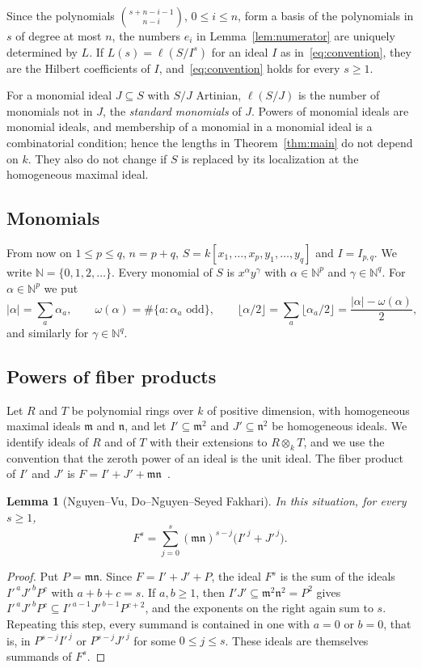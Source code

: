 \documentclass{amsart}
\newtheorem{lemma}[theorem]{Lemma}
\theoremstyle{definition}
\theoremstyle{remark}
\numberwithin{equation}{section}
\newcommand{\NN}{\mathbb{N}}
\newcommand{\mm}{\mathfrak{m}}
\newcommand{\fl}[1]{\lfloor #1\rfloor}
\begin{document}
Since the polynomials $\binom{s+n-i-1}{n-i}$, $0\le i\le n$, form a basis of the
polynomials in $s$ of degree at most $n$, the numbers $e_i$ in
Lemma~\ref{lem:numerator} are uniquely determined by $L$. If
$L(s)=\ell(S/I^s)$ for an ideal $I$ as in~\eqref{eq:convention}, they are the
Hilbert coefficients of $I$, and~\eqref{eq:convention} holds for every $s\ge1$.

For a monomial ideal $J\subseteq S$ with $S/J$ Artinian, $\ell(S/J)$ is the
number of monomials not in $J$, the \emph{standard monomials} of $J$. Powers of
monomial ideals are monomial ideals, and membership of a monomial in a monomial
ideal is a combinatorial condition; hence the lengths in Theorem~\ref{thm:main}
do not depend on $k$. They also do not change if $S$ is replaced by its localization
at the homogeneous maximal ideal.

\subsection{Monomials}
From now on $1\le p\le q$, $n=p+q$, $S=k[x_1,\dots,x_p,y_1,\dots,y_q]$ and
$I=I_{p,q}$. We write $\NN=\{0,1,2,\dots\}$. Every monomial of $S$ is $x^\alpha y^\gamma$ with $\alpha\in\NN^p$
and $\gamma\in\NN^q$. For $\alpha\in\NN^p$ we put
\[
  |\alpha|=\sum_a\alpha_a,\qquad
  \omega(\alpha)=\#\{a:\alpha_a\text{ odd}\},\qquad
  \fl{\alpha/2}=\sum_a\fl{\alpha_a/2}=\frac{|\alpha|-\omega(\alpha)}{2},
\]
and similarly for $\gamma\in\NN^q$.

\subsection{Powers of fiber products}
Let $R$ and $T$ be polynomial rings over $k$ of positive dimension, with
homogeneous maximal ideals $\mm$ and $\mathfrak n$, and let $I'\subseteq\mm^2$
and $J'\subseteq\mathfrak n^2$ be homogeneous ideals. We identify ideals of $R$
and of $T$ with their extensions to $R\otimes_kT$, and we use the convention
that the zeroth power of an ideal is the unit ideal. The fiber product of $I'$
and $J'$ is $F=I'+J'+\mm\mathfrak n$~\cite[Notation~4.3]{NV}.

\begin{lemma}[Nguyen--Vu, Do--Nguyen--Seyed Fakhari]\label{lem:powers}
In this situation, for every $s\ge1$,
\[
  F^s=\sum_{j=0}^{s}(\mm\mathfrak n)^{s-j}\bigl(I'^{\,j}+J'^{\,j}\bigr).
\]
\end{lemma}

\begin{proof}
Put $P=\mm\mathfrak n$. Since $F=I'+J'+P$, the ideal $F^s$ is the sum of the
ideals $I'^{\,a}J'^{\,b}P^c$ with $a+b+c=s$. If $a,b\ge1$, then
$I'J'\subseteq\mm^2\mathfrak n^2=P^2$ gives
$I'^{\,a}J'^{\,b}P^c\subseteq I'^{\,a-1}J'^{\,b-1}P^{c+2}$, and the exponents
on the right again sum to $s$. Repeating this step, every summand is contained
in one with $a=0$ or $b=0$, that is, in $P^{s-j}I'^{\,j}$ or $P^{s-j}J'^{\,j}$
for some $0\le j\le s$. These ideals are themselves summands of $F^s$.
\end{proof}
\end{document}
